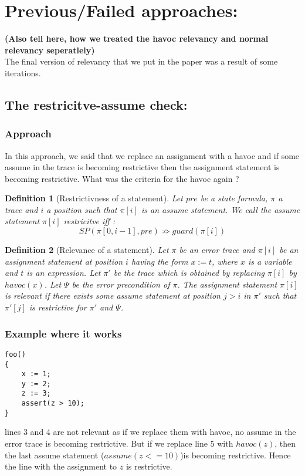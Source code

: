 \documentclass{article}
\newcommand{\limp}{\Rightarrow}
\newtheorem{mydef}{Definition}
\begin{document}
\section{Previous/Failed approaches:}
\textbf{(Also tell here, how we treated the havoc relevancy and normal relevancy seperatlely)} \\
The final version of relevancy that we put in the paper was a result of some iterations. 
\subsection{The restricitve-assume check:}
\subsubsection{Approach}
In this approach, we said that we replace an assignment with a havoc and if some assume in the trace is becoming restrictive then the assignment statement is becoming restrictive. What was the criteria for the havoc again ?
\begin{mydef}[Restrictivness of a statement]
Let $pre$ be a state formula, $\pi$ a trace and $i$ a position such that $\pi[i]$ is an assume statement. We call the assume statement $\pi[i]$ \emph{restricitve} iff :
$$SP(\pi[0,i-1], pre) \not \limp guard(\pi[i])$$
\end{mydef}

\begin{mydef}[Relevance of a statement]
Let $\pi$ be an error trace and $\pi[i]$ be an assignment statement at position $i$ having the form $x:=t$, where $x$ is a variable and $t$ is an expression. Let $\pi'$ be the trace which is obtained by replacing $\pi[i]$ by  $havoc(x)$. Let $\Psi$ be the error precondition of $\pi$. The assignment statement $\pi[i]$ is \emph{relevant} if there exists some assume statement at position $j > i$ in $\pi'$ such that $\pi'[j]$ is restrictive for $\pi'$ and $\Psi$. 
\end{mydef}
\subsubsection{Example where it works}
\begin{lstlisting}
foo()
{
	x := 1;
	y := 2;
	z := 3;
	assert(z > 10);
}
\end{lstlisting}
lines 3 and 4 are not relevant as if we replace them with havoc, no assume in the error trace is becoming restrictive. But if we replace line 5 with $havoc(z)$, then the last assume statement ($assume(z<=10)$)is becoming restrictive. Hence the line with the assignment to $z$ is restrictive.
\end{document}

